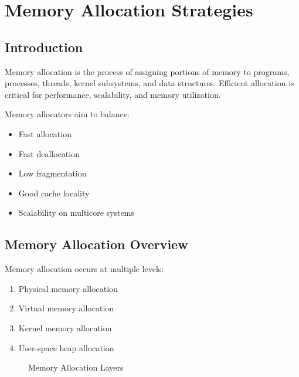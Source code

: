 \chapter{Memory Allocation Strategies}

\section{Introduction}

Memory allocation is the process of assigning portions of memory to programs, processes, threads, kernel subsystems, and data structures. Efficient allocation is critical for performance, scalability, and memory utilization.

Memory allocators aim to balance:

\begin{itemize}
\item Fast allocation
\item Fast deallocation
\item Low fragmentation
\item Good cache locality
\item Scalability on multicore systems
\end{itemize}

\section{Memory Allocation Overview}

Memory allocation occurs at multiple levels:

\begin{enumerate}
\item Physical memory allocation
\item Virtual memory allocation
\item Kernel memory allocation
\item User-space heap allocation
\end{enumerate}

\begin{figure}[H]
\centering
{}
\caption{Memory Allocation Layers}
\end{figure}

